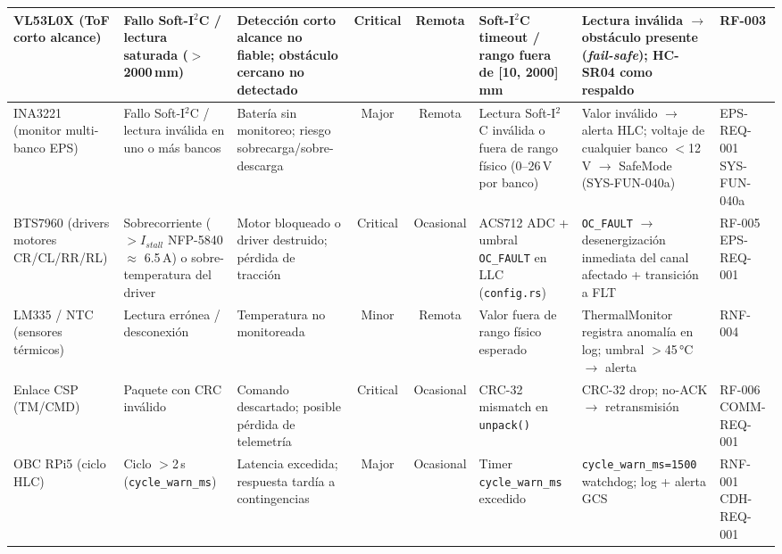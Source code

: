 \begin{landscape}
\begin{longtable}{| l | p{2.4cm} | p{2.8cm} | c | c | p{2.6cm} | p{3.8cm} | l |}
VL53L0X \newline (ToF corto alcance) &
Fallo Soft-I$^2$C / lectura saturada ($>$2000\,mm) &
Detección corto alcance no fiable; obstáculo cercano no detectado &
Critical & Remota &
Soft-I$^2$C timeout / rango fuera de [10, 2000]\,mm &
Lectura inválida $\rightarrow$ obstáculo presente (\textit{fail-safe}); HC-SR04 como respaldo &
RF-003 \\ \hline

INA3221 \newline (monitor multi-banco EPS) &
Fallo Soft-I$^2$C / lectura inválida en uno o más bancos &
Batería sin monitoreo; riesgo sobrecarga/sobre-descarga &
Major & Remota &
Lectura Soft-I$^2$C inválida o fuera de rango físico (0--26\,V por banco) &
Valor inválido $\rightarrow$ alerta HLC; voltaje de cualquier banco $<$12\,V $\rightarrow$ SafeMode (SYS-FUN-040a) &
EPS-REQ-001 \newline SYS-FUN-040a \\ \hline

BTS7960 \newline (drivers motores CR/CL/RR/RL) &
Sobrecorriente ($>I_{stall}$ NFP-5840 $\approx$ 6.5\,A) o sobre-temperatura del driver &
Motor bloqueado o driver destruido; pérdida de tracción &
Critical & Ocasional &
ACS712 ADC + umbral \texttt{OC\_FAULT} en LLC (\texttt{config.rs}) &
\texttt{OC\_FAULT} $\rightarrow$ desenergización inmediata del canal afectado + transición a FLT &
RF-005 \newline EPS-REQ-001 \\ \hline

LM335 / NTC \newline (sensores térmicos) &
Lectura errónea / desconexión &
Temperatura no monitoreada &
Minor & Remota &
Valor fuera de rango físico esperado &
ThermalMonitor registra anomalía en log; umbral $>$45\,°C $\rightarrow$ alerta &
RNF-004 \\ \hline

Enlace CSP \newline (TM/CMD) &
Paquete con CRC inválido &
Comando descartado; posible pérdida de telemetría &
Critical & Ocasional &
CRC-32 mismatch en \texttt{unpack()} &
CRC-32 drop; no-ACK $\rightarrow$ retransmisión &
RF-006 \newline COMM-REQ-001 \\ \hline

OBC RPi5 \newline (ciclo HLC) &
Ciclo $>$2\,s (\texttt{cycle\_warn\_ms}) &
Latencia excedida; respuesta tardía a contingencias &
Major & Ocasional &
Timer \texttt{cycle\_warn\_ms} excedido &
\texttt{cycle\_warn\_ms=1500} watchdog; log + alerta GCS &
RNF-001 \newline CDH-REQ-001 \\ \hline


\end{longtable}
\end{landscape}
